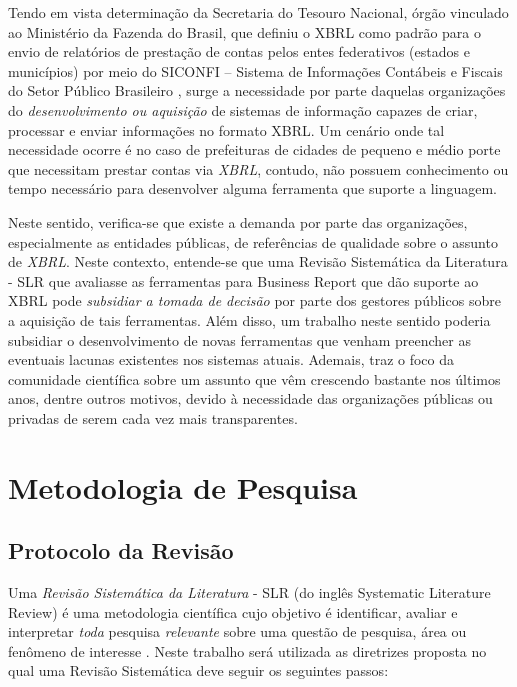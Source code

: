 \documentclass[12pt]{article}
\begin{document}
Tendo em vista determinação da Secretaria do Tesouro Nacional, órgão
vinculado ao  Ministério da Fazenda do Brasil, que definiu o XBRL como
padrão para o envio de relatórios de prestação de contas pelos entes
federativos (estados e municípios) por meio do SICONFI – Sistema de Informações Contábeis e Fiscais do Setor Público Brasileiro \cite{nt_03_2013}, surge a necessidade por parte
daquelas organizações do \textit{desenvolvimento ou aquisição} de sistemas de
informação capazes de criar, processar e enviar informações no formato
XBRL. Um cenário onde tal necessidade ocorre é no caso de prefeituras de cidades de pequeno e médio porte que necessitam prestar contas
via \textit{XBRL}, contudo, não possuem conhecimento ou tempo necessário para desenvolver alguma ferramenta que suporte a linguagem.

Neste sentido, verifica-se que existe a demanda por parte das organizações, especialmente as entidades públicas, de referências de qualidade sobre o assunto de \textit{XBRL}. Neste contexto, entende-se que uma Revisão Sistemática da Literatura - SLR  que avaliasse as ferramentas para Business Report que dão suporte ao XBRL pode \textit{subsidiar a tomada de decisão} por parte dos gestores públicos sobre a aquisição de tais ferramentas. Além disso, um trabalho neste sentido poderia subsidiar o desenvolvimento de novas ferramentas que venham preencher as eventuais lacunas existentes nos sistemas atuais. Ademais, traz o foco da comunidade científica sobre um assunto que vêm crescendo bastante nos últimos anos, dentre outros motivos, devido à necessidade das organizações públicas ou privadas de serem cada vez mais transparentes.


\section{Metodologia de Pesquisa}
\label{sec:metodologia}

\subsection{Protocolo da Revisão}
\label{subsec:protocolo}

Uma \textit{Revisão Sistemática da Literatura} - SLR (do inglês Systematic Literature Review) é uma
metodologia científica cujo objetivo é identificar, avaliar e interpretar
\textit{toda} pesquisa \textit{relevante} sobre uma questão de pesquisa, área
ou fenômeno de interesse \cite{keele2007guidelines,wohlin2012experimentation}. Neste trabalho
será utilizada as diretrizes proposta \cite{keele2007guidelines} no qual uma
Revisão Sistemática deve seguir os seguintes passos:
\end{document}
